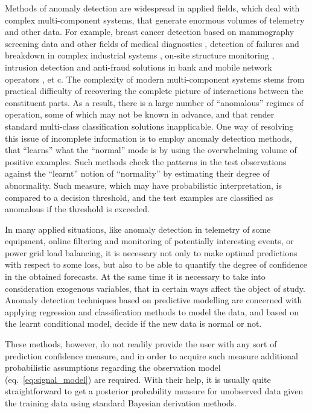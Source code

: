 \documentclass{extarticle}
\begin{document}

Methods of anomaly detection are widespread in applied fields, which deal with complex
multi-component systems, that generate enormous volumes of telemetry and other data.
For example, breast cancer detection based on mammography screening data \cite{tarassenko1995}
and other fields of medical diagnostics \cite{quinn2007,clifton2011}, detection of
failures and breakdown in complex industrial systems \cite{tarassenko2009}, on-site
structure monitoring \cite{surace2010}, intrusion detection and anti-fraud solutions
in bank and mobile network operators \cite{patcha2007,jyothsna2011}, et c. The complexity
of modern multi-component systems stems from practical difficulty of recovering the
complete picture of interactions between the constituent parts. As a result, there
is a large number of ``anomalous'' regimes of operation, some of which may not be
known in advance, and that render standard multi-class classification solutions inapplicable.
One way of resolving this issue of incomplete information is to employ anomaly detection
methods, that ``learns'' what the ``normal'' mode is by using the overwhelming volume
of positive examples. Such methods check the patterns in the test observations against
the ``learnt'' notion of ``normality'' by estimating their degree of abnormality.
Such measure, which may have probabilistic interpretation, is compared to a decision
threshold, and the test examples are classified as anomalous if the threshold is
exceeded.

In many applied situations, like anomaly detection in telemetry of some equipment,
online filtering and monitoring of potentially interesting events, or power grid
load balancing, it is necessary not only to make optimal predictions with respect
to some loss, but also to be able to quantify the degree of confidence in the obtained
forecasts. At the same time it is necessary to take into consideration exogenous
variables, that in certain ways affect the object of study. Anomaly detection techniques
based on predictive modelling are concerned with applying regression and classification
methods to model the data, and based on the learnt conditional model, decide if the
new data is normal or not.

These methods, however, do not readily provide the user with any sort of prediction
confidence measure, and in order to acquire such measure additional probabilistic
assumptions regarding the observation model (eq.~\ref{eq:signal_model}) are required.
With their help, it is usually quite straightforward to get a posterior probability
measure for unobserved data given the training data using standard Bayesian derivation
methods.
\end{document}
